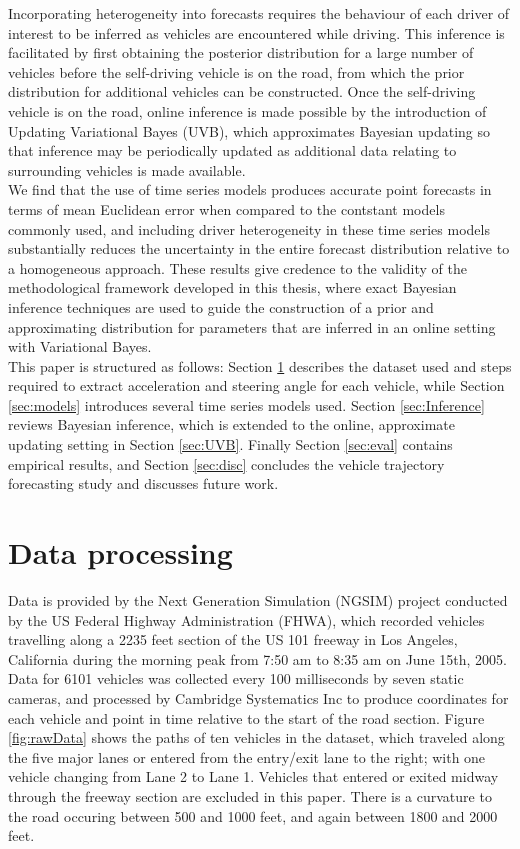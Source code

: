 \documentclass[12pt,a4paper]{article}\usepackage[]{graphicx}\usepackage[]{color}
\begin{document}
Incorporating heterogeneity into forecasts requires the behaviour of each driver of interest to be inferred as vehicles are encountered while driving. This inference is facilitated by first obtaining the posterior distribution for a large number of vehicles before the self-driving vehicle is on the road, from which the prior distribution for additional vehicles can be constructed. Once the self-driving vehicle is on the road, online inference is made possible by the introduction of Updating Variational Bayes (UVB), which approximates Bayesian updating so that inference may be periodically updated as additional data relating to surrounding vehicles is made available. 
\\

We find that the use of time series models produces accurate point forecasts in terms of mean Euclidean error when compared to the contstant models commonly used, and including driver heterogeneity in these time series models substantially reduces the uncertainty in the entire forecast distribution relative to a homogeneous approach. These results give credence to the validity of the methodological framework developed in this thesis, where exact Bayesian inference techniques are used to guide the construction of a prior and approximating distribution for parameters that are inferred in an online setting with Variational Bayes.
\\

This paper is structured as follows: Section \ref{sec:dataProcessing} describes the dataset used and steps required to extract acceleration and steering angle for each vehicle, while Section \ref{sec:models} introduces several time series models used. Section \ref{sec:Inference} reviews Bayesian inference, which is extended to the online, approximate updating setting in Section \ref{sec:UVB}. Finally Section \ref{sec:eval} contains empirical results, and Section \ref{sec:disc} concludes the vehicle trajectory forecasting study and discusses future work.

\section{Data processing}
\label{sec:dataProcessing}
Data is provided by the Next Generation Simulation (NGSIM) project conducted by the US Federal Highway Administration (FHWA), which recorded vehicles travelling along a 2235 feet section of the US 101 freeway in Los Angeles, California during the morning peak from 7:50 am to 8:35 am on June 15th, 2005. Data for 6101 vehicles was collected every 100 milliseconds by seven static cameras, and processed by Cambridge Systematics Inc to produce coordinates for each vehicle and point in time relative to the start of the road section. 
Figure \ref{fig:rawData} shows the paths of ten vehicles in the dataset, which traveled along the five major lanes or entered from the entry/exit lane to the right; with one vehicle changing from Lane 2 to Lane 1. Vehicles that entered or exited midway through the freeway section are excluded in this paper. There is a curvature to the road occuring between 500 and 1000 feet, and again between 1800 and 2000 feet.
\\
\end{document}
